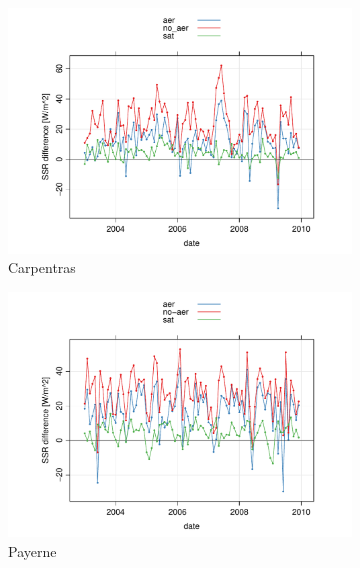 \begin{figure}[h!]
  \centering\begin{subfigure}{0.45\textwidth}
    \includegraphics[width=1.25\textwidth]{figs/capitulo6/CarpentrasMesesDif.pdf}
    \caption{Carpentras}
    \label{Carpentras}
  \end{subfigure}
  \centering\begin{subfigure}{0.45\textwidth}
    \includegraphics[width=1.25\textwidth]{figs/capitulo6/PayerneMesesDif.pdf}
    \caption{Payerne}
    \label{Payerne}
  \end{subfigure}
    \centering\begin{subfigure}{0.45\textwidth}

\end{subfigure}
\end{figure}
